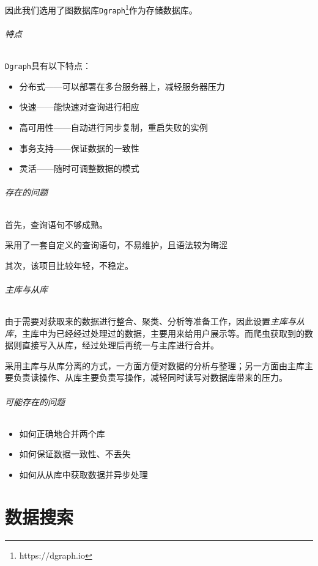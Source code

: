 \documentclass[UTF8]{ctexrep}
\begin{document}
因此我们选用了图数据库\texttt{Dgraph}\footnote{https://dgraph.io}作为存储数据库。

\paragraph{特点}

\texttt{Dgraph}具有以下特点：

\begin{itemize}
    \item 分布式——可以部署在多台服务器上，减轻服务器压力
    \item 快速——能快速对查询进行相应
    \item 高可用性——自动进行同步复制，重启失败的实例
    \item 事务支持——保证数据的一致性
    \item 灵活——随时可调整数据的模式
\end{itemize}

\paragraph{存在的问题}

首先，查询语句不够成熟。
\par
采用了一套自定义的查询语句，不易维护，且语法较为晦涩
\par
其次，该项目比较年轻，不稳定。

\paragraph{主库与从库}

由于需要对获取来的数据进行整合、聚类、分析等准备工作，因此设置\emph{主库与从库}，主库中为已经经过处理过的数据，主要用来给用户展示等。而爬虫获取到的数据则直接写入从库，经过处理后再统一与主库进行合并。

\par

采用主库与从库分离的方式，一方面方便对数据的分析与整理；另一方面由主库主要负责读操作、从库主要负责写操作，减轻同时读写对数据库带来的压力。

\paragraph{可能存在的问题}

\begin{itemize}
    \item 如何正确地合并两个库
    \item 如何保证数据一致性、不丢失
    \item 如何从从库中获取数据并异步处理
\end{itemize}


\part{数据搜索}

\end{document}
